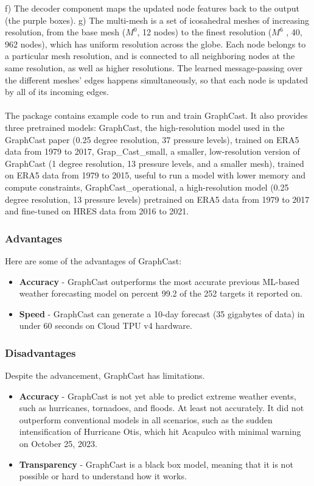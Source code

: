 \documentclass[../paper.tex]{subfiles}
\begin{document}
    f) The decoder component maps the updated node features back to the output (the purple boxes).
    g) The multi-mesh is a set of icosahedral meshes of increasing resolution, from the base mesh ($M^0$, 12 nodes) to the finest resolution ($M^6$ , 40, 962 nodes), which has uniform resolution across the globe.
    Each node belongs to a particular mesh resolution, and is connected to all neighboring nodes at the same resolution, as well as higher resolutions.
    The learned message-passing over the different meshes' edges happens simultaneously, so that each node is updated by all of its incoming edges.
    \\\\
    The package contains example code to run and train GraphCast.
    It also provides three pretrained models: GraphCast, the high-resolution model used in the GraphCast paper (0.25 degree resolution, 37 pressure levels),
    trained on ERA5 data from 1979 to 2017, Grap\_Cast\_small, a smaller, low-resolution version of GraphCast (1 degree resolution,
    13 pressure levels, and a smaller mesh), trained on ERA5 data from 1979 to 2015, useful to run a model with lower memory and compute constraints,
    GraphCast\_operational, a high-resolution model (0.25 degree resolution, 13 pressure levels) pretrained on ERA5 data from 1979 to 2017
    and fine-tuned on HRES data from 2016 to 2021\cite{e2}.

    \subsubsection{Advantages}
    Here are some of the advantages of GraphCast:
    \begin{itemize}
        \item \textbf{Accuracy} - GraphCast outperforms the most accurate previous ML-based weather forecasting model on percent 99.2 of the 252 targets it reported on\cite{e1}.
        \item \textbf{Speed} - GraphCast can generate a 10-day forecast (35 gigabytes of data) in under 60 seconds on Cloud TPU v4 hardware\cite{e1}.
    \end{itemize}

    \subsubsection{Disadvantages}
    Despite the advancement, GraphCast has limitations. \\
    \begin{itemize}
        \item \textbf{Accuracy} - GraphCast is not yet able to predict extreme weather events, such as hurricanes, tornadoes, and floods.
        At least not accurately.
        It did not outperform conventional models in all scenarios, such as the sudden intensification of Hurricane Otis, which hit Acapulco with minimal warning on October 25, 2023\cite{e4}.
        \item \textbf{Transparency} - GraphCast is a black box model, meaning that it is not possible or hard to understand how it works.
    \end{itemize}
\end{document}

